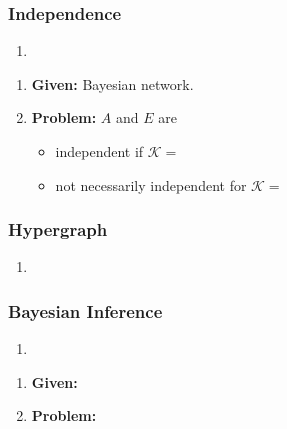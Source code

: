 \begin{example}
    
\end{example}

\subsubsection{Independence}
\begin{process}
    \begin{enumerate}
        \item 
    \end{enumerate}
\end{process}

\begin{example}
    \begin{enumerate}
        \item \textbf{Given:} Bayesian network.
        \item \textbf{Problem:} $A$ and $E$ are 
        \begin{itemize}
            \item independent if $\mathcal{K}=$
            \item not necessarily independent for $\mathcal{K}=$
        \end{itemize}
    \end{enumerate}
\end{example}
\newpage

\subsubsection{Hypergraph}
\begin{process}
    \begin{enumerate}
        \item 
    \end{enumerate}
\end{process}

\subsubsection{Bayesian Inference}
\begin{process}
    \begin{enumerate}
        \item 
    \end{enumerate}
\end{process}

\begin{example} 
    \begin{enumerate}
        \item \textbf{Given:}
        \item \textbf{Problem:}
    \end{enumerate}
\end{example}
\newpage

